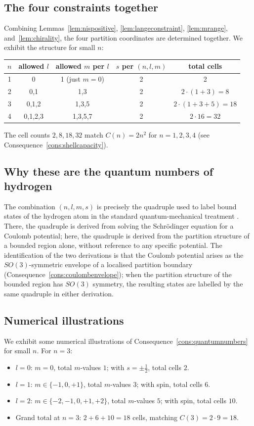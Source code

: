\subsection{The four constraints together}

Combining Lemmas~\ref{lem:nispositive}, \ref{lem:langeconstraint}, \ref{lem:mrange}, and~\ref{lem:chirality}, the four partition coordinates are determined together. We exhibit the structure for small $n$:
\begin{center}
\begin{tabular}{c|c|c|c|c}
\toprule
$n$ & allowed $l$ & allowed $m$ per $l$ & $s$ per $(n,l,m)$ & total cells\\
\midrule
1 & 0 & 1 (just $m=0$) & 2 & 2\\
2 & 0,1 & 1,3 & 2 & $2\cdot(1+3)=8$\\
3 & 0,1,2 & 1,3,5 & 2 & $2\cdot(1+3+5)=18$\\
4 & 0,1,2,3 & 1,3,5,7 & 2 & $2\cdot 16=32$\\
\bottomrule
\end{tabular}
\end{center}
The cell counts $2, 8, 18, 32$ match $C(n)=2n^{2}$ for $n=1,2,3,4$ (see Consequence~\ref{cons:shellcapacity}).

\subsection{Why these are the quantum numbers of hydrogen}

The combination $(n,l,m,s)$ is precisely the quadruple used to label bound states of the hydrogen atom in the standard quantum-mechanical treatment \citep{griffiths2018,sakurai2017}. There, the quadruple is derived from solving the Schr\"odinger equation for a Coulomb potential; here, the quadruple is derived from the partition structure of a bounded region alone, without reference to any specific potential. The identification of the two derivations is that the Coulomb potential arises as the $SO(3)$-symmetric envelope of a localised partition boundary (Consequence~\ref{cons:coulombenvelope}); when the partition structure of the bounded region has $SO(3)$ symmetry, the resulting states are labelled by the same quadruple in either derivation.

\subsection{Numerical illustrations}

We exhibit some numerical illustrations of Consequence~\ref{cons:quantumnumbers} for small $n$. For $n=3$:
\begin{itemize}
\item $l=0$: $m=0$, total $m$-values $1$; with $s=\pm\tfrac{1}{2}$, total cells $2$.
\item $l=1$: $m\in\{-1,0,+1\}$, total $m$-values $3$; with spin, total cells $6$.
\item $l=2$: $m\in\{-2,-1,0,+1,+2\}$, total $m$-values $5$; with spin, total cells $10$.
\item Grand total at $n=3$: $2+6+10=18$ cells, matching $C(3)=2\cdot 9=18$.
\end{itemize}

